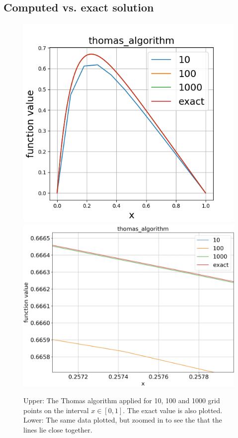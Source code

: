 \documentclass{emulateapj}
\begin{document}
    \subsection{Computed vs. exact solution}

        \begin{figure}[t]
            \centering
            \includegraphics[scale=0.6]{thomas_data.png}
            \includegraphics[scale=0.25]{thomas_data_zoom.png}
            \caption{Upper: The Thomas algorithm applied for 10, 100 and 1000 grid points on the interval \(x \in [0, 1]\). The exact value is also plotted. Lower: The same data plotted, but zoomed in to see the that the lines lie close together.}
            \label{fig:thomas_data}
        \end{figure}
        
\end{document}
